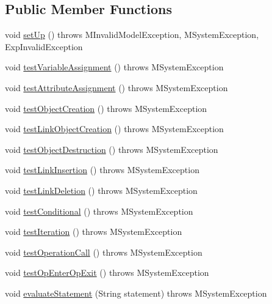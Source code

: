 \subsection*{Public Member Functions}
\begin{DoxyCompactItemize}
\item 
void \hyperlink{classorg_1_1tzi_1_1use_1_1uml_1_1sys_1_1soil_1_1_statement_effect_test_a09f6861c226c8d64a42c1818e9aa2c47}{set\-Up} ()  throws M\-Invalid\-Model\-Exception, M\-System\-Exception, Exp\-Invalid\-Exception 
\item 
void \hyperlink{classorg_1_1tzi_1_1use_1_1uml_1_1sys_1_1soil_1_1_statement_effect_test_a69f53b9c4faf2c4fe37381e04cc0bd7c}{test\-Variable\-Assignment} ()  throws M\-System\-Exception 
\item 
void \hyperlink{classorg_1_1tzi_1_1use_1_1uml_1_1sys_1_1soil_1_1_statement_effect_test_ad0a1a72ec44412253c3ca4a56d71a77a}{test\-Attribute\-Assignment} ()  throws M\-System\-Exception 
\item 
void \hyperlink{classorg_1_1tzi_1_1use_1_1uml_1_1sys_1_1soil_1_1_statement_effect_test_ad3d3d453753a75350c0d48c66af3d697}{test\-Object\-Creation} ()  throws M\-System\-Exception 
\item 
void \hyperlink{classorg_1_1tzi_1_1use_1_1uml_1_1sys_1_1soil_1_1_statement_effect_test_a6ab37a22854cc951bcfc06db138d1118}{test\-Link\-Object\-Creation} ()  throws M\-System\-Exception 
\item 
void \hyperlink{classorg_1_1tzi_1_1use_1_1uml_1_1sys_1_1soil_1_1_statement_effect_test_a6789c4f1110fde848c6d369619bdc2ae}{test\-Object\-Destruction} ()  throws M\-System\-Exception 
\item 
void \hyperlink{classorg_1_1tzi_1_1use_1_1uml_1_1sys_1_1soil_1_1_statement_effect_test_a95f093a0daf35e860809d865c041cd2d}{test\-Link\-Insertion} ()  throws M\-System\-Exception 
\item 
void \hyperlink{classorg_1_1tzi_1_1use_1_1uml_1_1sys_1_1soil_1_1_statement_effect_test_a7f5f3d75bd3d05ab8536f2d52f343fe9}{test\-Link\-Deletion} ()  throws M\-System\-Exception 
\item 
void \hyperlink{classorg_1_1tzi_1_1use_1_1uml_1_1sys_1_1soil_1_1_statement_effect_test_a5f5eaaa450b0156c975eff4bff9e01fd}{test\-Conditional} ()  throws M\-System\-Exception 
\item 
void \hyperlink{classorg_1_1tzi_1_1use_1_1uml_1_1sys_1_1soil_1_1_statement_effect_test_a9e2358ec41c9232a324a6d6bf914b085}{test\-Iteration} ()  throws M\-System\-Exception 
\item 
void \hyperlink{classorg_1_1tzi_1_1use_1_1uml_1_1sys_1_1soil_1_1_statement_effect_test_ae82dac7534e4fe149adf4bcfbe2b33a6}{test\-Operation\-Call} ()  throws M\-System\-Exception 
\item 
void \hyperlink{classorg_1_1tzi_1_1use_1_1uml_1_1sys_1_1soil_1_1_statement_effect_test_a63a80df7ae15925573357dbe5766d69a}{test\-Op\-Enter\-Op\-Exit} ()  throws M\-System\-Exception 
\item 
void \hyperlink{classorg_1_1tzi_1_1use_1_1uml_1_1sys_1_1soil_1_1_statement_effect_test_a713960c0ae9167bd568c4803216dff91}{evaluate\-Statement} (String statement)  throws M\-System\-Exception 
\end{DoxyCompactItemize}


